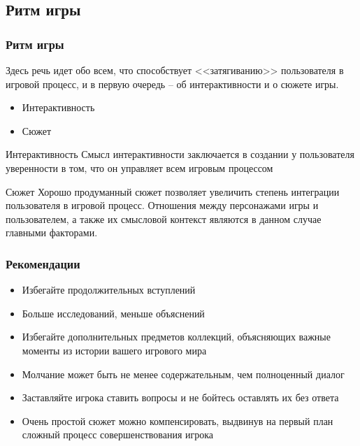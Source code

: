 \documentclass[10pt]{beamer}
\begin{document}
\subsection{Ритм игры}
\begin{frame}
\frametitle{Ритм игры}

\begin{block}{}
  Здесь речь идет обо всем, что способствует <<затягиванию>> пользователя в игровой процесс, и в первую очередь -- об интерактивности и о сюжете игры.
  \begin{itemize}
    \item Интерактивность
    \item Сюжет
  \end{itemize}
\end{block}

\end{frame}

\begin{frame}

\begin{block}{Интерактивность}
  Смысл интерактивности заключается в создании у пользователя уверенности в том, что он управляет всем игровым процессом
\end{block}

\begin{block}{Сюжет}
  Хорошо продуманный сюжет позволяет увеличить степень интеграции пользователя в игровой процесс. Отношения между персонажами игры и пользователем, а также их смысловой контекст являются в данном случае главными факторами.
\end{block}

\end{frame}

\begin{frame}
\frametitle{Рекомендации}

\begin{block}{}
  \begin{itemize}
    \item Избегайте продолжительных вступлений
    \item Больше исследований, меньше объяснений
    \item Избегайте дополнительных предметов коллекций, объясняющих важные моменты из истории вашего игрового мира
    \item Молчание может быть не менее содержательным, чем полноценный диалог
    \item Заставляйте игрока ставить вопросы и не бойтесь оставлять их без ответа
    \item Очень простой сюжет можно компенсировать, выдвинув на первый план сложный процесс совершенствования игрока
  \end{itemize}
\end{block}

\end{frame}
\end{document}
